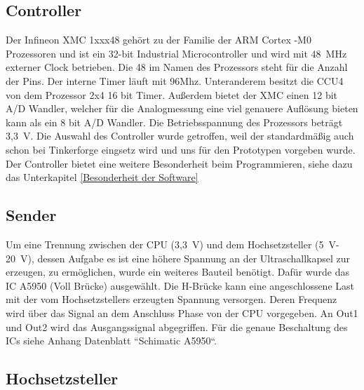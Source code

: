 \subsection{Controller}
Der Infineon XMC 1xxx48 gehört zu der Familie der ARM Cortex -M0 Prozessoren und ist ein 32-bit Industrial Microcontroller und wird mit 48~MHz externer Clock betrieben. Die 48 im Namen des Prozessors steht für die Anzahl der Pins. Der interne Timer läuft mit 96Mhz. Unteranderem besitzt die CCU4 von dem Prozessor 2x4 16 bit Timer. Außerdem bietet der XMC einen 12 bit A/D Wandler, welcher für die Analogmessung eine viel genauere Auflösung bieten kann als ein 8 bit A/D Wandler. Die Betriebsspannung des Prozessors beträgt 3,3~V. Die Auswahl des Controller wurde getroffen, weil der standardmäßig auch schon bei Tinkerforge eingsetz wird und uns für den Prototypen vorgeben wurde. Der Controller bietet eine weitere Besonderheit beim Programmieren, siehe dazu das Unterkapitel \ref{Besonderheit der Software}\\


\subsection{Sender}%
Um eine Trennung zwischen der CPU (3,3~V) und dem Hochsetzsteller (5~V-20~V), dessen Aufgabe es ist eine höhere Spannung an der Ultraschallkapsel zur erzeugen, zu ermöglichen, wurde ein weiteres Bauteil benötigt. Dafür wurde das IC A5950 (Voll Brücke) ausgewählt.
Die H-Brücke kann eine angeschlossene Last mit der vom Hochsetzstellers erzeugten Spannung versorgen. Deren Frequenz wird über das Signal an dem Anschluss Phase von der CPU vorgegeben. An Out1 und Out2 wird das Ausgangssignal abgegriffen. Für die genaue Beschaltung des ICs siehe Anhang Datenblatt “Schimatic A5950“.


\subsection{Hochsetzsteller}%

